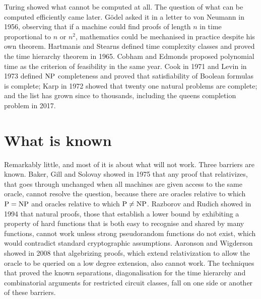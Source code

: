 Turing showed what cannot be computed at all. The question of what can be computed efficiently came later. G\"odel asked it in a letter to von Neumann in 1956, observing that if a machine could find proofs of length $n$ in time proportional to $n$ or $n^2$, mathematics could be mechanised in practice despite his own theorem. Hartmanis and Stearns defined time complexity classes and proved the time hierarchy theorem in 1965. Cobham and Edmonds proposed polynomial time as the criterion of feasibility in the same year. Cook in 1971 and Levin in 1973 defined $\mathrm{NP}$ completeness and proved that satisfiability of Boolean formulas is complete; Karp in 1972 showed that twenty one natural problems are complete; and the list has grown since to thousands, including the queens completion problem in 2017.

\section{What is known}

Remarkably little, and most of it is about what will not work. Three barriers are known. Baker, Gill and Solovay showed in 1975 that any proof that relativizes, that goes through unchanged when all machines are given access to the same oracle, cannot resolve the question, because there are oracles relative to which $\mathrm{P} = \mathrm{NP}$ and oracles relative to which $\mathrm{P} \neq \mathrm{NP}$. Razborov and Rudich showed in 1994 that natural proofs, those that establish a lower bound by exhibiting a property of hard functions that is both easy to recognise and shared by many functions, cannot work unless strong pseudorandom functions do not exist, which would contradict standard cryptographic assumptions. Aaronson and Wigderson showed in 2008 that algebrizing proofs, which extend relativization to allow the oracle to be queried on a low degree extension, also cannot work. The techniques that proved the known separations, diagonalisation for the time hierarchy and combinatorial arguments for restricted circuit classes, fall on one side or another of these barriers.

